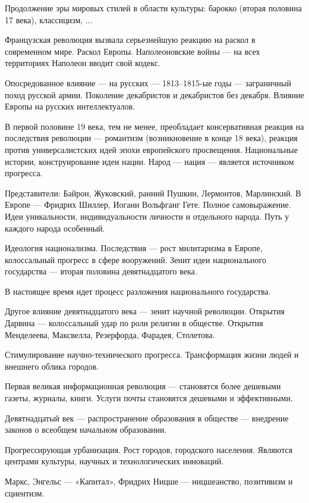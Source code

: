 \documentclass{article}
\begin{document}
Продолжение эры мировых стилей в области культуры: барокко (вторая половина 17 века), классицизм, ...

\hfill

Французская революция вызвала серьезнейшую реакцию на раскол в современном мире. Раскол Европы. Наполеоновские войны — на всех территориях Наполеон вводит свой кодекс.

Опосредованное влияние — на русских — 1813–1815-ые годы — заграничный поход русской армии. Поколение декабристов и декабристов без декабря. Влияние Европы на русских интеллектуалов.

В первой половине 19 века, тем не менее, преобладает консервативная реакция на последствия революции — романтизм (возникновение в конце 18 века), реакция против универсалистских идей эпохи европейского просвещения. Национальные истории, конструирование идеи нации. Народ — нация — является источником прогресса.

Представители: Байрон, Жуковский, ранний Пушкин, Лермонтов, Марлинский. В Европе — Фридрих Шиллер, Иоганн Вольфганг Гете. Полное самовыражение. Идеи уникальности, индивидуальности личности и отдельного народа. Путь у каждого народа особенный.

Идеология национализма. Последствия — рост милитаризма в Европе, колоссальный прогресс в сфере вооружений. Зенит идеи национального государства — вторая половина девятнадцатого века.

В настоящее время идет процесс разложения национального государства.

\hfill

Другое влияние девятнадцатого века — зенит научной революции. Открытия Дарвина — колоссальный удар по роли религии в обществе. Открытия Менделеева, Максвелла, Резерфорда, Фарадея, Столетова.

Стимулирование научно-технического прогресса. Трансформация жизни людей и внешнего облика городов.

Первая великая информационная революция — становятся более дешевыми газеты, журналы, книги. Услуги почты становятся дешевыми и эффективными.

\hfill

Девятнадцатый век — распространение образования в обществе — внедрение законов о всеобщем начальном образовании.

Прогрессирующая урбанизация. Рост городов, городского населения. Являются центрами культуры, научных и технологических инноваций.

Маркс, Энгельс — «Капитал», Фридрих Ницше — ницшеанство, позитивизм и сциентизм.
\end{document}
